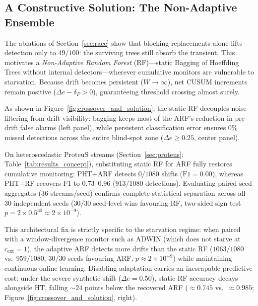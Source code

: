 \documentclass[10pt,conference]{IEEEtran}
\theoremstyle{definition}
\begin{document}


\subsection{A Constructive Solution: The Non-Adaptive Ensemble}\label{sec:solution_rf}

The ablations of Section~\ref{sec:race} show that blocking replacements alone lifts detection only to $49/100$: the surviving trees still absorb the transient. This motivates a \emph{Non-Adaptive Random Forest} (RF)---static Bagging of Hoeffding Trees without internal detectors---wherever cumulative monitors are vulnerable to starvation. Because drift becomes persistent ($W \to \infty$), net CUSUM increments remain positive ($\Delta e - \delta_P > 0$), guaranteeing threshold crossing almost surely.

As shown in Figure~\ref{fig:crossover_and_solution}, the static RF decouples noise filtering from drift visibility: bagging keeps most of the ARF's reduction in pre-drift false alarms (left panel), while persistent classification error ensures $0\%$ missed detections across the entire blind-spot zone ($\Delta e \ge 0.25$, center panel).

On heteroscedastic ProteuS streams (Section~\ref{sec:proteus}; Table~\ref{tab:results_concept}), substituting static RF for ARF fully restores cumulative monitoring: PHT+ARF detects $0/1080$ shifts ($\mathrm{F1}=0.00$), whereas PHT+RF recovers $\mathrm{F1}$ to $0.73$--$0.96$ ($913/1080$ detections). Evaluating paired seed aggregates ($36$ streams/seed) confirms complete statistical separation across all $30$ independent seeds ($30/30$ seed-level wins favouring RF, two-sided sign test $p = 2 \times 0.5^{30} \approx 2 \times 10^{-9}$).

This architectural fix is strictly specific to the starvation regime: when paired with a window-divergence monitor such as ADWIN (which does not starve at $c_{\mathrm{ext}}=1$), the adaptive ARF detects more drifts than the static RF ($1063/1080$ vs.\ $959/1080$, $30/30$ seeds favouring ARF, $p \approx 2 \times 10^{-9}$) while maintaining continuous online learning. Disabling adaptation carries an inescapable predictive cost: under the severe synthetic shift ($\Delta e = 0.50$), static RF accuracy decays alongside HT, falling ${\sim}24$ points below the recovered ARF ($\approx 0.745$ vs.\ $\approx 0.985$; Figure~\ref{fig:crossover_and_solution}, right).

\end{document}
